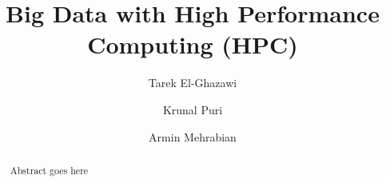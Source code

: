 \documentclass[runningheads,a4paper]{llncs}
\begin{document}


\title{Big Data with High Performance Computing (HPC)}

\author{Tarek El-Ghazawi \and Krunal Puri \and Armin Mehrabian}

%

			
\maketitle

\begin{abstract}
Abstract goes here
\end{abstract}


\end{document}
